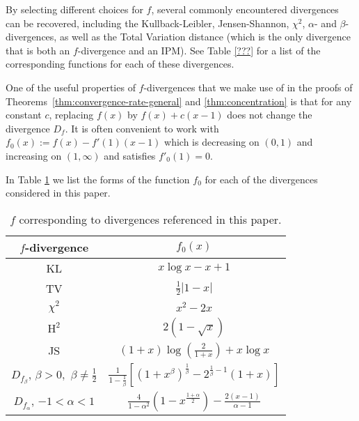 By selecting different choices for $f$, several commonly encountered divergences can be recovered, including the Kullback-Leibler, Jensen-Shannon, $\chi^2$, $\alpha$- and $\beta$-divergences, as well as the Total Variation distance (which is the only divergence that is both an $f$-divergence and an IPM).
See Table \ref{???} for a list of the corresponding functions for each of these divergences.



One of the useful properties of $f$-divergences that we make use of in the proofs of Theorems~\ref{thm:convergence-rate-general} and \ref{thm:concentration} is that for any constant $c$, replacing $f(x)$ by $f(x) + c(x-1)$ does not change the divergence $D_f$. 
It is often convenient to work with $f_0(x) := f(x) - f'(1)(x-1)$ which is decreasing on $(0, 1)$ and increasing on $(1, \infty)$ and satisfies $f'_0(1)=0$.

In Table \ref{table:f-fns} we list the forms of the function $f_0$ for each of the divergences considered in this paper.


{
\renewcommand{\arraystretch}{2}
\begin{table}
 \caption{$f$ corresponding to divergences referenced in this paper.}
 \label{table:f-fns}
 \centering
 \begin{tabular}{c c} 
 \toprule
 $f$-divergence & $f_0(x)$ \\
 \midrule
 KL & $x \log x - x + 1$\\
 TV & $\frac{1}{2}|1-x|$\\
 $\chi^2$ & $x^2 - 2x$\\
 $\text{H}^2$ & $2(1-\sqrt{x})$\\
 JS & $(1+x)\log(\frac{2}{1+x}) + x\log x$\\
 $D_{f_\beta}$, $\beta > 0,$ $\beta\not=\frac{1}{2}$ & $\frac{1}{1-\frac{1}{\beta}}\left[ (1+x^\beta)^{\frac{1}{\beta}} - 2^{\frac{1}{\beta}-1}(1+x) \right]$\\
 $D_{f_\alpha}$, $-1<\alpha < 1$ & $\frac{4}{1-\alpha^2}\left( 1 - x^{\frac{1+\alpha}{2}} \right) - \frac{2(x-1)}{\alpha-1}$ \\
 \bottomrule
\end{tabular}
\end{table}
}



